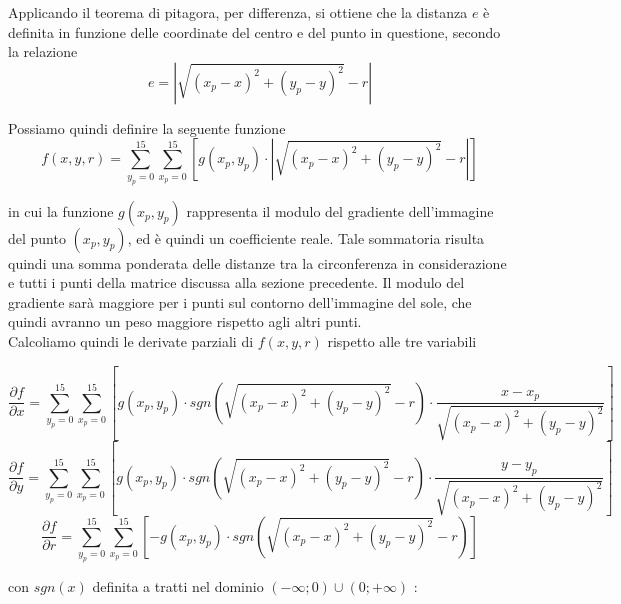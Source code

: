 \documentclass[12pt]{article}
\begin{document}
        \noindent
        Applicando il teorema di pitagora, per differenza, si ottiene che la distanza $ e $ è definita in funzione delle coordinate del centro e del punto in questione, secondo la relazione
        \begin{equation}
             e = \left| \sqrt{(x_p-x)^2 + (y_p-y)^2} -r \right|
        \end{equation}
        
        \noindent
        Possiamo quindi definire la seguente funzione
        \begin{equation}
            f(x, y, r) = \sum_{y_p = 0}^{15} \sum_{x_p = 0}^{15} \left[ g(x_p, y_p) \cdot \left| \sqrt{(x_p-x)^2 + (y_p-y)^2} -r \right| \right] 
        \end{equation}
        
        \noindent
        in cui la funzione $ g(x_p, y_p) $ rappresenta il modulo del gradiente dell'immagine del punto $ (x_p, y_p) $, ed è quindi un coefficiente reale. Tale sommatoria risulta quindi una somma ponderata delle distanze tra la circonferenza in considerazione e tutti i punti della matrice discussa alla sezione precedente. Il modulo del gradiente sarà maggiore per i punti sul contorno dell'immagine del sole, che quindi avranno un peso maggiore rispetto agli altri punti.\\
        Calcoliamo quindi le derivate parziali di $ f(x, y, r) $ rispetto alle tre variabili
        
        \begin {equation}
            \frac{\partial f}{\partial x} = \sum_{y_p = 0}^{15} \sum_{x_p = 0}^{15} \left[ g(x_p, y_p) \cdot sgn \left( \sqrt{(x_p-x)^2 + (y_p-y)^2} - r \right) \cdot \frac{x - x_p}{\sqrt{(x_p - x)^2 + (y_p - y)^2}} \right] 
        \end {equation}
        \begin {equation}
            \frac{\partial f}{\partial y} = \sum_{y_p = 0}^{15} \sum_{x_p = 0}^{15} \left[ g(x_p, y_p) \cdot sgn \left( \sqrt{(x_p-x)^2 + (y_p-y)^2} - r \right) \cdot \frac{y - y_p}{\sqrt{(x_p - x)^2 + (y_p - y)^2}} \right] 
        \end {equation}
        \begin {equation}
            \frac{\partial f}{\partial r} = \sum_{y_p = 0}^{15} \sum_{x_p = 0}^{15} \left[ - g(x_p, y_p) \cdot sgn \left( \sqrt{(x_p-x)^2 + (y_p-y)^2} - r \right) \right] 
        \end {equation}
        
        \noindent
        con $ sgn(x)$ definita a tratti nel dominio $(- \infty ; 0) \cup (0; +\infty) $ :
        
\end{document}
